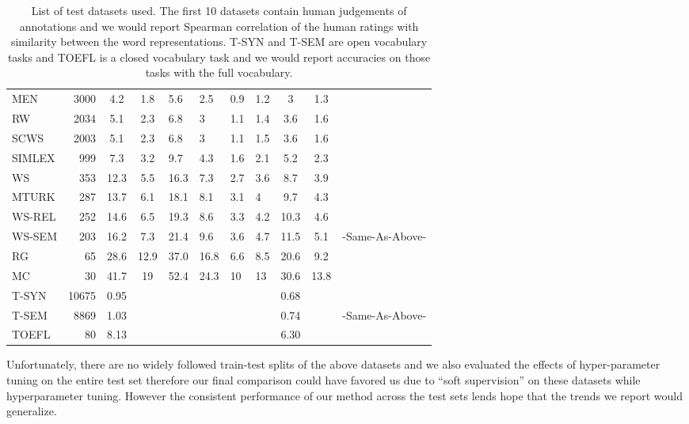 \documentclass[11pt]{article}
\begin{document}
\begin{table*}[ht]
{\begin{tabular}{lr  cc  HH  HH  cc  l}
    MEN    & 3000  & 4.2  & 1.8  & 5.6  & 2.5  & 0.9 & 1.2 & 3    & 1.3  & \cite{bruni2012distributional}  \\
    RW     & 2034  & 5.1  & 2.3  & 6.8  & 3    & 1.1 & 1.4 & 3.6  & 1.6  & \cite{Luong2013morpho}          \\
    SCWS   & 2003  & 5.1  & 2.3  & 6.8  & 3    & 1.1 & 1.5 & 3.6  & 1.6  & \cite{Huang2012Improving}       \\
    SIMLEX & 999   & 7.3  & 3.2  & 9.7  & 4.3  & 1.6 & 2.1 & 5.2  & 2.3  & \cite{hill2014simlex}           \\
    WS     & 353   & 12.3 & 5.5  & 16.3 & 7.3  & 2.7 & 3.6 & 8.7  & 3.9  & \cite{finkelstein2001placing}   \\
    MTURK  & 287   & 13.7 & 6.1  & 18.1 & 8.1  & 3.1 & 4   & 9.7  & 4.3  & \cite{Radinsky2011word}         \\
    WS-REL & 252   & 14.6 & 6.5  & 19.3 & 8.6  & 3.3 & 4.2 & 10.3 & 4.6  & \cite{agirre2009study}          \\
    WS-SEM & 203   & 16.2 & 7.3  & 21.4 & 9.6  & 3.6 & 4.7 & 11.5 & 5.1  & -Same-As-Above-                 \\
    RG     & 65    & 28.6 & 12.9 & 37.0 & 16.8 & 6.6 & 8.5 & 20.6 & 9.2  & \cite{Rubenstein1965Contextual} \\
    MC     & 30    & 41.7 & 19   & 52.4 & 24.3 & 10  & 13  & 30.6 & 13.8 & \cite{miller1991contextual}     \\ \hline
    T-SYN  & 10675 & 0.95 &      &      &      &     &     & 0.68 &      & \cite{mikolov2013distributed}   \\
    T-SEM  & 8869  & 1.03 &      &      &      &     &     & 0.74 &      & -Same-As-Above-                 \\ \hline
    TOEFL  & 80    & 8.13 &      &      &      &     &     & 6.30 &      & \cite{landauer1997solution}
  \end{tabular}
  }
  \caption{List of test datasets used. The first 10 datasets contain human
    judgements of annotations and we would report Spearman correlation
    of  the human ratings with similarity between the word
    representations.
    T-SYN and T-SEM are open vocabulary tasks and TOEFL is a closed
    vocabulary task and we would report accuracies on
  those tasks with the full vocabulary.}
\end{table*}

Unfortunately, there are no widely followed train-test splits of the above
datasets and we also evaluated the effects of hyper-parameter tuning
on the entire test set therefore our final comparison could have
favored us due to ``soft supervision'' on these datasets while
hyperparameter tuning. However the consistent performance of our
method across the test sets lends hope that the trends we report would
generalize.
\end{document}
